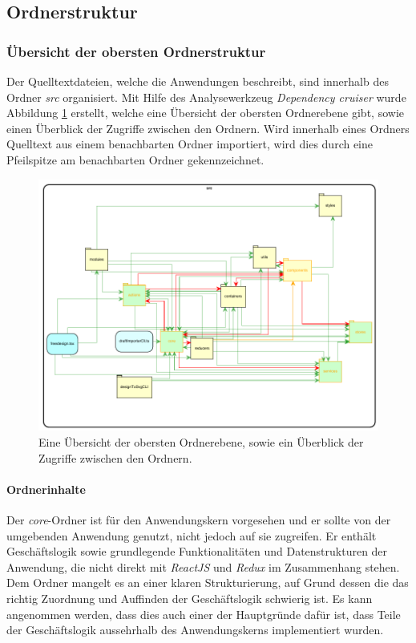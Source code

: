 \subsection{Ordnerstruktur}

\subsubsection{Übersicht der obersten Ordnerstruktur}
Der Quelltextdateien, welche die Anwendungen beschreibt, sind innerhalb des Ordner \emph{src} organisiert. 
Mit Hilfe des Analysewerkzeug \emph{Dependency cruiser} wurde Abbildung \ref{fig:obersteOrdnerebene}  erstellt, welche eine Übersicht der obersten Ordnerebene gibt, sowie einen Überblick der Zugriffe zwischen den Ordnern. Wird innerhalb eines Ordners Quelltext aus einem benachbarten Ordner importiert, wird dies durch eine Pfeilspitze am benachbarten Ordner gekennzeichnet. 

\begin{figure}[H]
	\centering
    \caption{Eine Übersicht der obersten Ordnerebene, sowie ein Überblick der Zugriffe zwischen den Ordnern.}
	\label{fig:obersteOrdnerebene}
	\includegraphics{diagrams/Ist-Architektur/high-level-graph.pdf}
\end{figure}

\paragraph{Ordnerinhalte}
Der \emph{core}-Ordner ist für den Anwendungskern vorgesehen und er sollte von der umgebenden Anwendung genutzt, nicht jedoch auf sie zugreifen. Er enthält Geschäftslogik sowie grundlegende Funktionalitäten und Datenstrukturen der Anwendung, die nicht direkt mit \emph{ReactJS} und \emph{Redux} im Zusammenhang stehen. Dem Ordner mangelt es an einer klaren Strukturierung, auf Grund dessen die das richtig Zuordnung und Auffinden der Geschäftslogik schwierig ist. Es kann angenommen werden, dass dies auch einer der Hauptgründe dafür ist, dass Teile der Geschäftslogik aussehrhalb des Anwendungskerns implementiert wurden. 

